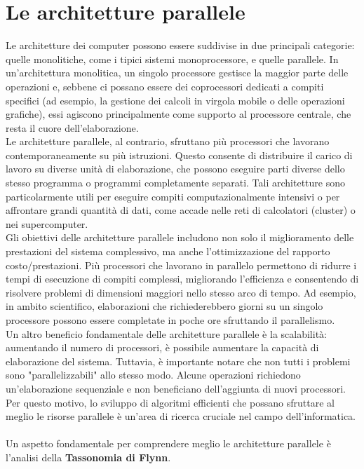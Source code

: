 \documentclass[12pt]{report}
\begin{document}
	\chapter{Le architetture parallele}
	Le architetture dei computer possono essere suddivise in due principali categorie: quelle monolitiche, come i tipici sistemi monoprocessore, e quelle parallele. In un'architettura monolitica, un singolo processore gestisce la maggior parte delle operazioni e, sebbene ci possano essere dei coprocessori dedicati a compiti specifici (ad esempio, la gestione dei calcoli in virgola mobile o delle operazioni grafiche), essi agiscono principalmente come supporto al processore centrale, che resta il cuore dell'elaborazione.
	\vspace{\baselineskip}\\
	Le architetture parallele, al contrario, sfruttano più processori che lavorano contemporaneamente su più istruzioni. Questo consente di distribuire il carico di lavoro su diverse unità di elaborazione, che possono eseguire parti diverse dello stesso programma o programmi completamente separati. Tali architetture sono particolarmente utili per eseguire compiti computazionalmente intensivi o per affrontare grandi quantità di dati, come accade nelle reti di calcolatori (cluster) o nei supercomputer.
	\vspace{\baselineskip}\\
	Gli obiettivi delle architetture parallele includono non solo il miglioramento delle prestazioni del sistema complessivo, ma anche l'ottimizzazione del rapporto costo/prestazioni. Più processori che lavorano in parallelo permettono di ridurre i tempi di esecuzione di compiti complessi, migliorando l'efficienza e consentendo di risolvere problemi di dimensioni maggiori nello stesso arco di tempo. Ad esempio, in ambito scientifico, elaborazioni che richiederebbero giorni su un singolo processore possono essere completate in poche ore sfruttando il parallelismo.
	\vspace{\baselineskip}\\
	Un altro beneficio fondamentale delle architetture parallele è la scalabilità: aumentando il numero di processori, è possibile aumentare la capacità di elaborazione del sistema. Tuttavia, è importante notare che non tutti i problemi sono "parallelizzabili" allo stesso modo. Alcune operazioni richiedono un'elaborazione sequenziale e non beneficiano dell'aggiunta di nuovi processori. Per questo motivo, lo sviluppo di algoritmi efficienti che possano sfruttare al meglio le risorse parallele è un'area di ricerca cruciale nel campo dell'informatica.
	\\\\
	Un aspetto fondamentale per comprendere meglio le architetture parallele è l'analisi della \textbf{Tassonomia di Flynn}.
	
\end{document}
